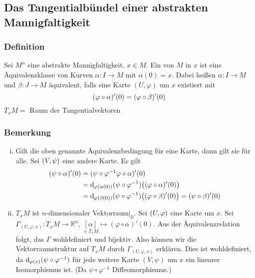 \subsection{Das Tangentialbündel einer abstrakten Mannigfaltigkeit}
\label{sub:15}

\subsubsection{Definition}
\label{ssub:151}
Sei $M^n$ eine abstrakte Mannigfaltigkeit, $x\in M$. Ein  von $M$ in $x$ ist eine Äquivalenzklasse von Kurven $\alpha : I\to M$ mit $\alpha(0) = x$. Dabei heißen $\alpha:I\to M$ und $\beta:J\to M$ äquivalent, falls eine Karte $(U,\varphi)$ um $x$ existiert mit
\[
\enbrace{\varphi \circ \alpha}'(0) = \enbrace{\varphi \circ \beta}'(0)
\]
$T_x M =$ Raum der Tangentialvektoren

\subsubsection{Bemerkung}
\label{ssub:152}
\begin{enumerate}[(i)]
\item Gilt die oben genannte Äquivalenzbedingung für eine Karte, dann gilt sie für alle.
Sei $\enbrace{V,\psi}$ eine andere Karte. Es gilt
\begin{align*}
\enbrace{\psi \circ \alpha}'(0) &= \enbrace{\psi \circ \varphi^{-1} \varphi \circ \alpha}'(0)\\
&= \mathd_{\varphi(\alpha(0))} (\psi \circ \varphi^{-1})\enbrace[\big]{(\varphi \circ \alpha)'(0)}\\
&= \mathd_{\varphi(\beta(0))} (\psi \circ \varphi^{-1})\enbrace[\big]{(\varphi \circ \beta)'(0)} = \enbrace{\psi \circ \beta}'(0)
\end{align*}
\item $T_x M$ ist $n$-dimensionaler Vektorraum$\vert_{\mathds{R}}$.
Sei $\enbrace{U,\varphi}$ eine Karte um $x$. Sei $\Gamma_{(U,\varphi,x)}: T_x M\to \mathds{R}^n$, $\underset{\in T_x M}{[\alpha]} \mapsto (\varphi \circ \alpha)' (0)$. Aus der Äquivalenzrelation folgt, das $\Gamma$ wohldefiniert und bijektiv. Also können wir die Vektorraumstruktur auf $T_x M$ durch $\Gamma_{(U,\varphi,x)}$ erklären. Dies ist wohldefiniert, da $\mathd_{\varphi(x)} (\psi \circ \varphi^{-1})$ für jede weitere Karte $(V,\psi)$ um $x$ ein linearer Isomorphismus ist. (Da $\psi \circ \varphi^{-1}$ Diffeomorphismus.) 
\end{enumerate}

